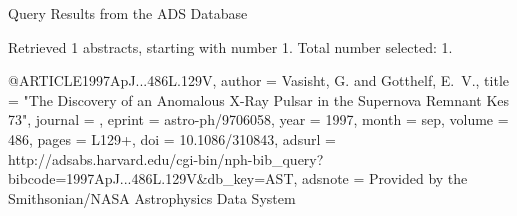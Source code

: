Query Results from the ADS Database


Retrieved 1 abstracts, starting with number 1.  Total number selected: 1.

@ARTICLE{1997ApJ...486L.129V,
   author = {{Vasisht}, G. and {Gotthelf}, E.~V.},
    title = "{The Discovery of an Anomalous X-Ray Pulsar in the Supernova Remnant Kes 73}",
  journal = {\apjl},
   eprint = {astro-ph/9706058},
     year = 1997,
    month = sep,
   volume = 486,
    pages = {L129+},
      doi = {10.1086/310843},
   adsurl = {http://adsabs.harvard.edu/cgi-bin/nph-bib_query?bibcode=1997ApJ...486L.129V&db_key=AST},
  adsnote = {Provided by the Smithsonian/NASA Astrophysics Data System}
}


